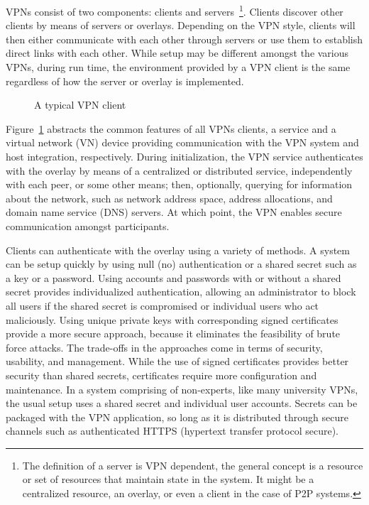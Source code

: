 VPNs consist of two components: clients and servers~\footnote{The definition of
a server is VPN dependent, the general concept is a resource or set of
resources that maintain state in the system.  It might be a centralized
resource, an overlay, or even a client in the case of P2P systems.}.  Clients
discover other clients by means of servers or overlays.  Depending on the VPN
style, clients will then either communicate with each other through servers or
use them to establish direct links with each other.  While setup may be
different amongst the various VPNs, during run time, the environment provided
by a VPN client is the same regardless of how the server or overlay is
implemented.  

\begin{figure}
\centering
{}
\caption{A typical VPN client}
\label{fig:vpn}
\end{figure}

Figure~\ref{fig:vpn} abstracts the common features of all VPNs clients, a
service and a virtual network (VN) device providing communication with the VPN
system and host integration, respectively.  During initialization, the VPN
service authenticates with the overlay by means of a centralized or distributed
service, independently with each peer, or some other means; then, optionally,
querying for information about the network, such as network address space,
address allocations, and domain name service (DNS) servers.  At which point,
the VPN enables secure communication amongst participants.

Clients can authenticate with the overlay using a variety of methods.  A system
can be setup quickly by using null (no) authentication or a shared secret such
as a key or a password.  Using accounts and passwords with or without a shared
secret provides individualized authentication, allowing an administrator to
block all users if the shared secret is compromised or individual users who act
maliciously.  Using unique private keys with corresponding signed certificates
provide a more secure approach, because it eliminates the feasibility of brute
force attacks.  The trade-offs in the approaches come in terms of security,
usability, and management.  While the use of signed certificates provides
better security than shared secrets, certificates require more configuration
and maintenance.  In a system comprising of non-experts, like many university
VPNs, the usual setup uses a shared secret and individual user accounts.
Secrets can be packaged with the VPN application, so long as it is distributed
through secure channels such as authenticated HTTPS (hypertext transfer
protocol secure).

